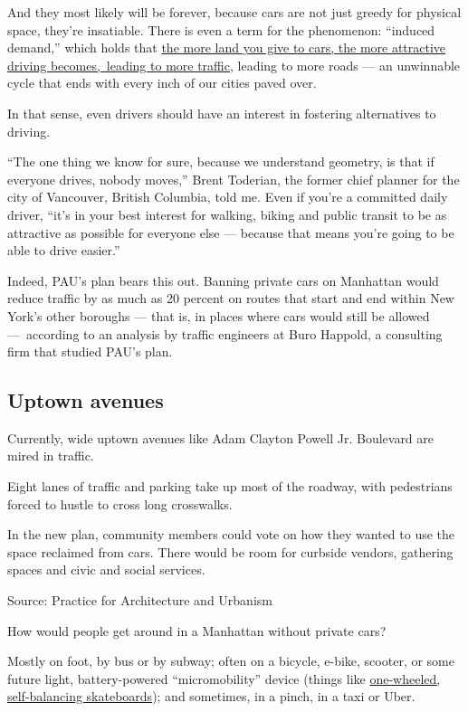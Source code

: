 And they most likely will be forever, because cars are not just greedy
for physical space, they're insatiable. There is even a term for the
phenomenon: ``induced demand,'' which holds that
\href{https://www.wired.com/2014/06/wuwt-traffic-induced-demand/}{the
more land you give to cars, the more attractive driving becomes,~leading
to more traffic}, leading to more roads --- an unwinnable cycle that
ends with every inch of our cities paved over.

In that sense, even drivers should have an interest in fostering
alternatives to driving.

``The one thing we know for sure, because we understand geometry, is
that if everyone drives, nobody moves,'' Brent Toderian, the former
chief planner for the city of Vancouver, British Columbia, told me. Even
if you're a committed daily driver, ``it's in your best interest for
walking, biking and public transit to be as attractive as possible for
everyone else --- because that means you're going to be able to drive
easier.''

Indeed, PAU's plan bears this out. Banning private cars on Manhattan
would reduce traffic by as much as 20 percent on routes that start and
end within New York's other boroughs --- that is, in places where cars
would still be allowed ---~according to an analysis by traffic engineers
at Buro Happold, a consulting firm that studied PAU's plan.

\hypertarget{uptown-avenues}{%
\subsection{Uptown avenues}\label{uptown-avenues}}

Currently, wide uptown avenues like Adam Clayton Powell Jr. Boulevard
are mired in traffic.

Eight lanes of traffic and parking take up most of the roadway, with
pedestrians forced to hustle to cross long crosswalks.

In the new plan, community members could vote on how they wanted to use
the space reclaimed from cars. There would be room for curbside vendors,
gathering spaces and civic and social services.

Source: Practice for Architecture and Urbanism

How would people get around in a Manhattan without private cars?

Mostly on foot, by bus or by subway; often on a bicycle, e-bike,
scooter, or some future light, battery-powered ``micromobility'' device
(things like
\href{https://www.wired.com/story/one-wheeled-vehicles-micromobility/}{one-wheeled,
self-balancing skateboards}); and sometimes, in a pinch, in a taxi or
Uber.

